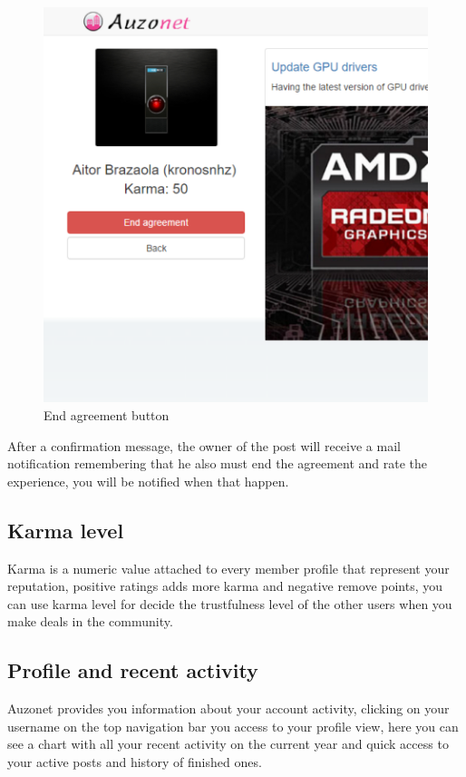 \documentclass{DeustoFDP}
\begin{document}
\begin{figure}[h!]
\centering
\includegraphics[width=0.9\linewidth]{fig/Manual/endagreementclient}
\caption[End agreement button]{End agreement button}
\label{fig:endagreementclient}
\end{figure}


After a confirmation message, the owner of the post will receive a mail notification remembering that he also must end the agreement and rate the experience, you will be notified when that happen.
\newpage
\subsection{Karma level}
Karma is a numeric value attached to every member profile that represent your reputation, positive ratings adds more karma and negative remove points, you can use karma level for decide the trustfulness level of the other users when you make deals in the community.

\subsection{Profile and recent activity}
Auzonet provides you information about your account activity, clicking on your username on the top navigation bar you access to your profile view, here you can see a chart with all your recent activity on the current year and quick access to your active posts and history of finished ones.
\end{document}

